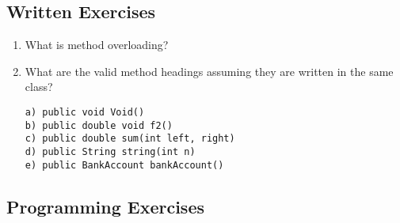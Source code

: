 
\subsection{Written Exercises}

\setcounter{counter}{1}
\begin{enumerate}[label={\arabic{counter}\addtocounter{counter}{1}}.]

\item What is method overloading? 

\item What are the valid method headings assuming they are written in the same class?
\begin{lstlisting}
a) public void Void()
b) public double void f2()
c) public double sum(int left, right)
d) public String string(int n)
e) public BankAccount bankAccount()
\end{lstlisting}

\end{enumerate}

\subsection{Programming Exercises}